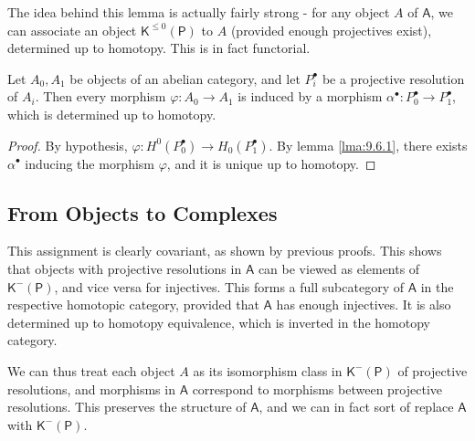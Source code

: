 The idea behind this lemma is actually fairly strong - for any object $A$ of $\mathsf{A} $, we can associate an object $\mathsf{K}^{\leq 0} (\mathsf{P} )$ to $A$ (provided enough projectives exist), determined up to homotopy. This is in fact functorial.
\begin{proposition}\label{prp:9.6.2}
	Let $A_0,A_1$ be objects of an abelian category, and let $P_i^{\bullet} $ be a projective resolution of $A_i$. Then every morphism $\varphi : A_0 \to A_1$ is induced by a morphism $\alpha ^{\bullet} : P_0^{\bullet}  \to P_1^{\bullet} $, which is determined up to homotopy.
\end{proposition}
\begin{proof}
	By hypothesis, $\varphi : H^0(P_0^{\bullet} ) \to H_0(P_1^{\bullet} )$. By lemma \ref{lma:9.6.1}, there exists $\alpha ^{\bullet} $ inducing the morphism $\varphi $, and it is unique up to homotopy.
\end{proof}
\subsection{From Objects to Complexes}
This assignment is clearly covariant, as shown by previous proofs. This shows that objects with projective resolutions in $\mathsf{A} $ can be viewed as elements of $\mathsf{K} ^{-} (\mathsf{P} )$, and vice versa for injectives. This forms a full subcategory of $\mathsf{A} $ in the respective homotopic category, provided that $\mathsf{A} $ has enough injectives. It is also determined up to homotopy equivalence, which is inverted in the homotopy category.

We can thus treat each object $A$ as its isomorphism class in $\mathsf{K} ^{-} (\mathsf{P} )$ of projective resolutions, and morphisms in $\mathsf{A} $ correspond to morphisms between projective resolutions. This preserves the structure of $\mathsf{A} $, and we can in fact sort of replace $\mathsf{A} $ with $\mathsf{K} ^{-} (\mathsf{P} )$.

